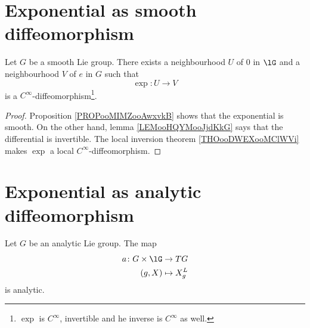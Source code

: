 \section{Exponential as smooth diffeomorphism}


\begin{proposition}     \label{PROPooYFZZooLUOuOj}
	Let \( G\) be a smooth Lie group. There exists a neighbourhood \( U\) of \( 0\) in \( \lG\) and a neighbourhood \( V\) of \( e\) in \( G\) such that
	\begin{equation}
		\exp\colon U\to V
	\end{equation}
	is a \(  C^{\infty}\)-diffeomorphism\footnote{\( \exp\) is \(  C^{\infty}\), invertible and he inverse is \(  C^{\infty}\) as well.}.
\end{proposition}

\begin{proof}
	Proposition \ref{PROPooMIMZooAwxvkB} shows that the exponential is smooth. On the other hand, lemma \ref{LEMooHQYMooJjdKkG} says that the differential is invertible. The local inversion theorem \ref{THOooDWEXooMClWVi} makes \( \exp\) a local \(  C^{\infty}\)-diffeomorphism.
\end{proof}

\section{Exponential as analytic diffeomorphism}

\begin{proposition}	\label{PROPooEWNLooUiBbtE}
	Let \( G\) be an analytic Lie group. The map
	\begin{equation}
		\begin{aligned}
			a\colon G\times \lG & \to TG           \\
			(g,X)               & \mapsto    X^L_g
		\end{aligned}
	\end{equation}
	is analytic.
\end{proposition}

